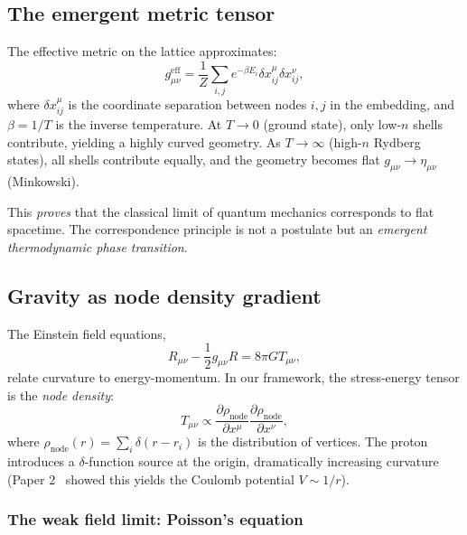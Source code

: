 \documentclass[aps,prd,twocolumn,superscriptaddress,groupedaddress,showpacs]{revtex4-2}
\begin{document}
\subsection{The emergent metric tensor}

The effective metric on the lattice approximates:
\begin{equation}
g_{\mu\nu}^{\text{eff}} = \frac{1}{Z} \sum_{i,j} e^{-\beta E_i} \delta x^\mu_{ij} \delta x^\nu_{ij},
\end{equation}
where $\delta x^\mu_{ij}$ is the coordinate separation between nodes $i, j$ in the embedding, and $\beta = 1/T$ is the inverse temperature. At $T \to 0$ (ground state), only low-$n$ shells contribute, yielding a highly curved geometry. As $T \to \infty$ (high-$n$ Rydberg states), all shells contribute equally, and the geometry becomes flat $g_{\mu\nu} \to \eta_{\mu\nu}$ (Minkowski).

This \emph{proves} that the classical limit of quantum mechanics corresponds to flat spacetime. The correspondence principle is not a postulate but an \emph{emergent thermodynamic phase transition}.

\subsection{Gravity as node density gradient}

The Einstein field equations,
\begin{equation}
R_{\mu\nu} - \frac{1}{2} g_{\mu\nu} R = 8\pi G T_{\mu\nu},
\end{equation}
relate curvature to energy-momentum. In our framework, the stress-energy tensor is the \emph{node density}:
\begin{equation}
T_{\mu\nu} \propto \frac{\partial \rho_{\text{node}}}{\partial x^\mu} \frac{\partial \rho_{\text{node}}}{\partial x^\nu},
\end{equation}
where $\rho_{\text{node}}(r) = \sum_i \delta(r - r_i)$ is the distribution of vertices. The proton introduces a $\delta$-function source at the origin, dramatically increasing curvature (Paper 2~\cite{Louthan_II} showed this yields the Coulomb potential $V \sim 1/r$).

\subsubsection{The weak field limit: Poisson's equation}
\end{document}
